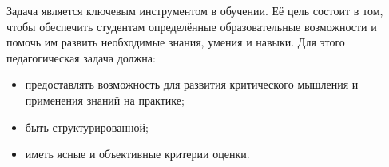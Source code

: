 Задача является ключевым инструментом в обучении. 
Её цель состоит в том, чтобы обеспечить студентам определённые образовательные возможности и помочь им развить необходимые знания, умения и навыки.
 Для этого педагогическая задача должна:
\begin{itemize}
    \item предоставлять возможность для развития критического мышления и применения знаний на практике;
    \item быть структурированной;
    \item иметь ясные и объективные критерии оценки.
\end{itemize}




